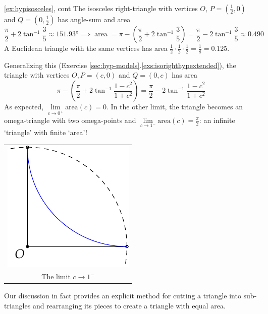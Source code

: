 \begin{example*}{\ref{ex:hypisosceles}, cont}{}
The isosceles right-triangle with vertices $O$, $P=(\frac 12,0)$ and $Q=(0,\frac 12)$ has angle-sum and area
\[\frac\pi 2+2\tan^{-1}\frac 35\approx \ang{151.93}\implies \operatorname{area}=\pi-\left(\frac\pi 2+2\tan^{-1}\frac 35\right) =\frac\pi 2-2\tan^{-1}\frac 35\approx 0.490\]
A Euclidean triangle with the same vertices has area $\frac 12\cdot\frac 12\cdot\frac 12=\frac 18=0.125$.\par

\begin{minipage}[t]{0.7\linewidth}\vspace{0pt}
Generalizing this (Exercise \ref*{sec:hyp-models}.\ref{exs:isorighthypextended}), the triangle with vertices $O,P=(c,0)$ and $Q=(0,c)$ has area
\[\pi-\left(\frac\pi 2+2\tan^{-1}\frac{1-c^2}{1+c^2}\right)=\frac\pi 2-2\tan^{-1}\frac{1-c^2}{1+c^2}\]
As expected, $\lim\limits_{c\to 0^+}\text{area}(c)=0$. In the other limit, the triangle becomes an omega-triangle with two omega-points and $\lim\limits_{c\to 1^-}\text{area}(c)=\frac\pi 2$: an infinite `triangle' with finite `area'!
\end{minipage}\hfill\begin{minipage}[t]{0.29\linewidth}\vspace{0pt}
\flushright\begin{tabular}{c@{}}
\includegraphics{area-iso}\\
The limit $c\to 1^-$
\end{tabular}
\end{minipage}
\end{example*}\vfil

Our discussion in fact provides an explicit method for cutting a triangle into sub-triangles and rearranging its pieces to create a triangle with equal area.

